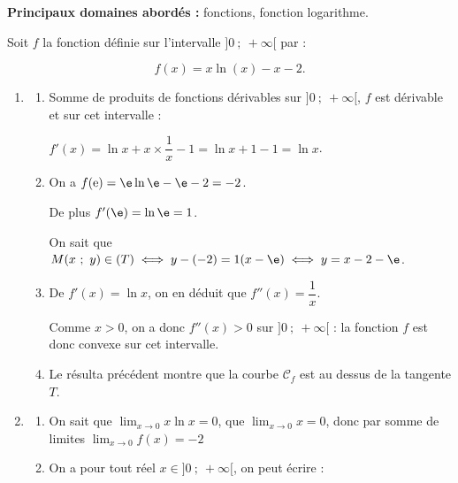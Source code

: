 
\textbf{Principaux domaines abordés :} fonctions, fonction logarithme.

\medskip

Soit $f$ la fonction définie sur l'intervalle $]0~;~+\infty[$ par :

\[f(x) = x \ln (x) - x - 2.\]

%
%

\begin{enumerate}
\item 
	\begin{enumerate}
		\item %
		Somme de produits de fonctions dérivables sur $]0~;~+\infty[$, \: $f$ est dérivable et sur cet intervalle :
		
		$f'(x) = \ln x + x \times \dfrac1x - 1 = \ln x + 1 - 1 = \ln x$.
		\item %
On a $f(\text{e}) = \e \ln \e - \e - 2 = - 2$.

De plus $f'(\e) = \ln \e = 1$.

On sait que $M(x~;~y) \in (T) \iff y - (- 2) = 1(x - \e) \iff y = x - 2 - \e$.
		\item %
De $f'(x) = \ln x$, on en déduit que $f''(x) = \dfrac1x$.

Comme $x > 0$, on a donc $f''(x) > 0$ sur $]0~;~+\infty[$ : la fonction $f$ est donc convexe sur cet intervalle.
		\item %
		Le résulta précédent montre que la courbe $\mathcal{C}_f$ est au dessus de la tangente $T$.
	\end{enumerate}	
\item 
	\begin{enumerate}
		\item %
On sait que $\displaystyle\lim_{x \to 0} x \ln x = 0$, que $\displaystyle\lim_{x \to 0} x  = 0$, donc par somme de limites $\displaystyle\lim_{x \to 0} f(x) = - 2$
		\item %
On a pour tout réel $x \in ]0~;~+ \infty[$, on peut écrire :


\end{enumerate}
\end{enumerate}
